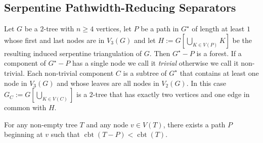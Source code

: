 \documentclass[kpfonts]{patmorin}
\DeclareMathOperator{\pw}{pw}
\DeclareMathOperator{\sh}{cbt}
\DeclareMathOperator{\cbt}{cbt}
\DeclareMathOperator{\dc}{dc}
\begin{document}
%
%
%
%

\subsection{Serpentine Pathwidth-Reducing Separators}


Let $G$ be a $2$-tree with $n\ge 4$ vertices, let $P$ be a path in $G^\star$ of length at least $1$ whose first and last nodes are in $V_3(G)$ and let $H:=G[\bigcup_{K\in V(P)} K]$ be the resulting induced serpentine triangulation of $G$.  Then $G^\star-P$ is a forest.  If a component of $G^\star-P$ has a single node we call it \emph{trivial} otherwise we call it non-trivial. Each non-trivial component $C$ is a subtree of $G^\star$ that contains at least one node in $V_3(G)$ and whose leaves are all nodes in $V_2(G)$. In this case $G_C:=G[\bigcup_{K\in V(C)}]$ is a $2$-tree that has exactly two vertices and one edge in common with $H$.

\begin{lem}
    For any non-empty tree $T$ and any node $v\in V(T)$, there exists a path $P$ beginning at $v$ such that $\cbt(T-P)<\cbt(T)$.
\end{lem}
\end{document}
